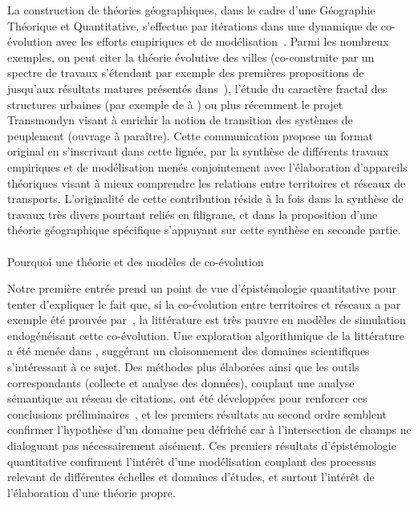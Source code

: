 La construction de théories géographiques, dans le cadre d'une Géographie Théorique et Quantitative, s'effectue par itérations dans une dynamique de co-évolution avec les efforts empiriques et de modélisation~\cite{livet2010}. Parmi les nombreux exemples, on peut citer la théorie évolutive des villes (co-construite par un spectre de travaux s'étendant par exemple des premières propositions de \cite{pumain1997pour} jusqu'aux résultats matures présentés dans~\cite{pumain2012multi}), l'étude du caractère fractal des structures urbaines (par exemple de \cite{frankhauser1998fractal} à \cite{frankhauser2008fractal}) ou plus récemment le projet Transmondyn visant à enrichir la notion de transition des systèmes de peuplement (ouvrage à paraître). Cette communication propose un format original en s'inscrivant dans cette lignée, par la synthèse de différents travaux empiriques et de modélisation menés conjointement avec l'élaboration d'appareils théoriques visant à mieux comprendre les relations entre territoires et réseaux de transports. L'originalité de cette contribution réside à la fois dans la synthèse de travaux très divers pourtant reliés en filigrane, et dans la proposition d'une théorie géographique spécifique s'appuyant sur cette synthèse en seconde partie.



\paragraph{}{Pourquoi une théorie et des modèles de co-évolution}


Notre première entrée prend un point de vue d'épistémologie quantitative pour tenter d'expliquer le fait que, si la co-évolution entre territoires et réseaux a par exemple été prouvée par~\cite{bretagnolle:tel-00459720}, la littérature est très pauvre en modèles de simulation endogénéisant cette co-évolution. Une exploration algorithmique de la littérature a été menée dans \cite{raimbault2015models}, suggérant un cloisonnement des domaines scientifiques s'intéressant à ce sujet. Des méthodes plus élaborées ainsi que les outils correspondants (collecte et analyse des données), couplant une analyse sémantique au réseau de citations, ont été développées pour renforcer ces conclusions préliminaires~\cite{raimbault2016indirect}, et les premiers résultats au second ordre semblent confirmer l'hypothèse d'un domaine peu défriché car à l'intersection de champs ne dialoguant pas nécessairement aisément. Ces premiers résultats d'épistémologie quantitative confirment l'intérêt d'une modélisation couplant des processus relevant de différentes échelles et domaines d'études, et surtout l'intérêt de l'élaboration d'une théorie propre.


